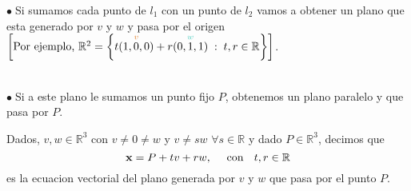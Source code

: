 \documentclass{article}
\theoremstyle{definition}
\theoremstyle{remark}
\newcommand\bl{$\bullet\;$}
\begin{document}
\begin{figure}[h]
\centering
\def\svgwidth{0.75\textwidth}

\end{figure}
\pagebreak
\bl Si sumamos cada punto de $l_1$ con un punto de $l_2$ vamos a obtener un plano que esta generado por $v$ y $w$ y pasa por el origen $\left[\text{Por ejemplo, }\mathbb{R}^2=\left\{t\overset{\textcolor{rojop2}{v}}{(1,0,0)}+r\overset{\textcolor{verdep2}{w}}{(0,1,1)}\; : \; t,r \in \mathbb{R}\right\}\right]$.
\begin{figure}[h]
\centering
\def\svgwidth{0.75\textwidth}

\end{figure}
\\
\bl Si a este plano le sumamos un punto fijo $P$, obtenemos un plano paralelo y que pasa por $P$.
\begin{defi}
  Dados, $v,w \in \mathbb{R}^3$ con $v \neq 0 \neq w$ y $v \neq sw $ $\forall s \in \mathbb{R}$ y dado $P \in \mathbb{R}^3$, decimos que \[ 
    \mathbf{x}=P+tv+rw, \text{ \quad con \; } t,r \in \mathbb{R} 
  \] es la ecuacion vectorial del plano generada por $v$ y $w$ que pasa por el punto $P$.
\end{defi}
\end{document}
